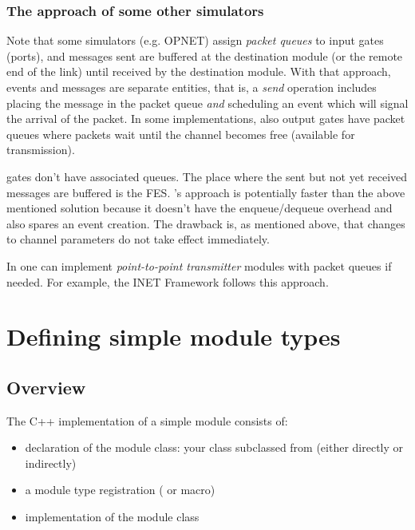 \subsubsection{The approach of some other simulators}


Note that some simulators (e.g. OPNET) assign \textit{packet queues}
to input gates (ports), and messages sent are buffered at the
destination module (or the remote end of the link) until received by
the destination module. With that approach, events and messages are
separate entities, that is, a \textit{send} operation includes placing
the message in the packet queue \textit{and} scheduling an event which
will signal the arrival of the packet. In some implementations, also
output gates have packet queues where packets wait until the channel
becomes free (available for transmission).

{\opp} gates don't have associated queues. The place
where the sent but not yet received messages are buffered is the
FES.  {\opp}'s approach is potentially faster
than the above mentioned solution because it doesn't have the
enqueue/dequeue overhead and also spares an event creation. The
drawback is, as mentioned above, that changes to channel parameters do
not take effect immediately.

In {\opp} one can implement \textit{point-to-point transmitter} modules
with packet queues if needed. For example, the INET Framework
follows this approach.




\section{Defining simple module types}

\subsection{Overview}

The C++ implementation of a simple module consists of:
\begin{itemize}
\item{declaration of the module class: your class subclassed from 
(either directly or indirectly)}
\item{a module type registration ( or
     macro)}
\item{implementation of the module class}
\end{itemize}


